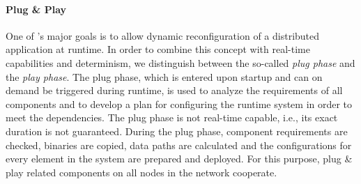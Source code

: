 %
%

\paragraph{Plug \& Play}

One of \xme's major goals is to allow dynamic reconfiguration of a distributed application at runtime.
In order to combine this concept with real-time capabilities and determinism, we distinguish between the so-called \emph{plug phase} and the \emph{play phase}.
The plug phase, which is entered upon startup and can on demand be triggered during runtime,
is used to analyze the requirements of all components and to develop a plan for configuring the runtime system in order to meet the dependencies.
The plug phase is not real-time capable, i.e., its exact duration is not guaranteed.
During the plug phase, component requirements are checked, binaries are copied, data paths are calculated and the configurations for every element in the system are prepared and deployed.
For this purpose, plug \& play related components on all nodes in the network cooperate.

